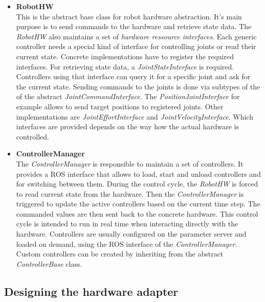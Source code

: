 \begin{itemize}

\item \textbf{RobotHW} \\

This is the abstract base class for robot hardware abstraction. It's main purpose is to send commands to the hardware and retrieve state data. The \emph{RobotHW} also maintains a set of \emph{hardware ressource interfaces}. Each generic controller needs a special kind of interface for controlling joints or read their current state. Concrete implementations have to register the required interfaces. For retrieving state data, a \emph{JointStateInterface} is required. Controllers using that interface can query it for a specific joint and ask for the current state. Sending commands to the joints is done via subtypes of the of the abstract \emph{JointCommandInterface}. The \emph{PositionJointInterface} for example allows to send target positions to registered joints. Other implementations are \emph{JointEffortInterface} and \emph{JointVelocityInterface}. Which interfaces are provided depends on the way how the actual hardware is controlled.

\item \textbf{ControllerManager} \\

The \emph{ControllerManager} is responsible to maintain a set of controllers. It provides a ROS interface that allows to load, start and unload controllers and for switching between them. During the control cycle, the \emph{RobotHW} is forced to read current state from the hardware. Then the \emph{ControllerManager} is triggered to update the active controllers based on the current time step. The commanded values are then sent back to the concrete hardware. This control cycle is intended to run in real time when interacting directly with the hardware. Controllers are usually configured on the parameter server and loaded on demand, using the ROS interface of the \emph{ControllerManager}. Custom controllers can be created by inheriting from the abstract  \emph{ControllerBase} class.  

\end{itemize}

\subsection{Designing the hardware adapter}

